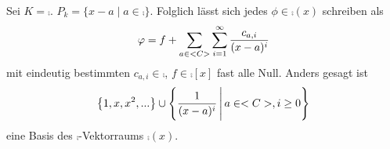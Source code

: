 \begin{example}
	Sei $K=\comp$. $P_k = \{x-a\mid a\in \comp\}$. Folglich lässt sich jedes $\phi\in \comp(x)$ schreiben als
	\begin{align}
		\varphi = f + \sum_{a\in<C>}\sum_{i=1}^\infty \frac{c_{a,i}}{(x-a)^i}\notag
	\end{align}
	mit eindeutig bestimmten $c_{a,i}\in\comp$, $f\in\comp[x]$ fast alle Null. Anders gesagt ist 
	\begin{align}
		\left\lbrace 1,x,x^2,...\right\rbrace \cup \left\lbrace \frac{1}{(x-a)^i}\,\Bigg\vert\, a\in<C>,i\ge 0\right\rbrace \notag
	\end{align}
	eine Basis des $\comp$-Vektorraums $\comp(x)$.
\end{example}